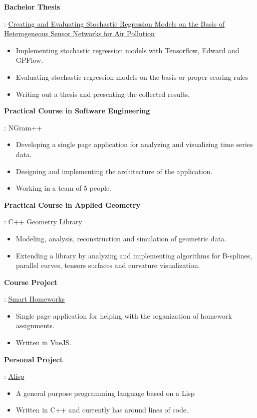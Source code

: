 \documentclass[letterpaper,10pt]{article}
\newcommand{\resumeItem}[2]{
\item\small{
    \textbf{#1}{: #2 \vspace{-2pt}}
  }
}
\newcommand{\resumeSubItem}[2]{\resumeItem{#1}{#2}\vspace{-4pt}}
\begin{document}
\resumeSubItem{Bachelor Thesis}
{
  \href{https://github.com/palikar/PollutionDev/}{\color{blue}\underline{Creating and Evaluating Stochastic Regression Models on the Basis of Heterogeneous Sensor Networks for Air Pollution}}
  \vspace{-5pt}
  \begin{itemize}
  \item Implementing stochastic regression models with Tensorflow, Edward and GPFlow.
  \item Evaluating stochastic regression models on the basis or proper scoring rules
  \item Writing out a thesis and presenting the collected results.
  \end{itemize}
}

\resumeSubItem{Practical Course in Software Engineering}
{NGram++
  \vspace{-5pt}
  \begin{itemize}
  \item Developing a single page application for analyzing and visualizing time series data.
  \item Designing and implementing the architecture of the application.
  \item Working in a team of 5 people.
  \end{itemize}
}

\resumeSubItem{Practical Course in Applied Geometry}
{C++ Geometry Library
  \vspace{-5pt}
  \begin{itemize}
  \item Modeling, analysis, reconstruction and simulation of geometric data.
  \item Extending a library by analyzing and implementing algorithms for B-splines, parallel curves, tensors surfaces and curvature visualization.
  \end{itemize}
}

\resumeSubItem{Course Project}
{\href{https://github.com/palikar/HomeworksSmart/}{\color{blue}\underline{Smart Homeworks}}
  \vspace{-5pt}
  \begin{itemize}
  \item Single page application for helping with the organization of homework assignments.\@
  \item Written in VueJS.\@
  \end{itemize}
}

\resumeSubItem{Personal Project}
{\href{https://github.com/palikar/alisp}{\color{blue}\underline{Alisp}}
  \vspace{-5pt}
  \begin{itemize}
  \item A general purpose programming language based on a Lisp
  \item Written in C++ and currently has around \numprint{25000} lines of code.\@
  \end{itemize}
}
\end{document}
